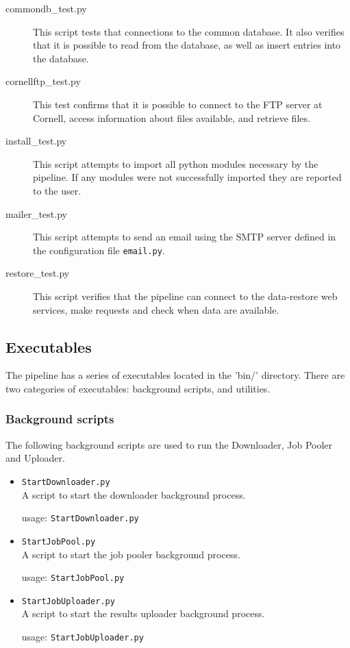 \begin{description}
    \item[commondb\_test.py] This script tests that connections to the common database. It also verifies that it is possible to read from the database, as well as insert entries into the database.

    \item[cornellftp\_test.py] This test confirms that it is possible to connect to the FTP server at Cornell, access information about files available, and retrieve files.

    \item[install\_test.py] This script attempts to import all python modules necessary by the pipeline. If any modules were not successfully imported they are reported to the user.

    \item[mailer\_test.py] This script attempts to send an email using the SMTP server defined in the configuration file \texttt{email.py}.

    \item[restore\_test.py] This script verifies that the pipeline can connect to the data-restore web services, make requests and check when data are available.
\end{description}

\subsection{Executables}
The pipeline has a series of executables located in the 'bin/' directory. There are two categories of executables: background scripts, and utilities.

\subsubsection{Background scripts}
The following background scripts are used to run the Downloader, Job Pooler and Uploader.
\begin{itemize}
    \item \texttt{StartDownloader.py} \hfill \\
        A script to start the downloader background process.

        usage: \texttt{StartDownloader.py}

    \item \texttt{StartJobPool.py} \hfill \\
        A script to start the job pooler background process.

        usage: \texttt{StartJobPool.py}

    \item \texttt{StartJobUploader.py} \hfill \\
        A script to start the results uploader background process.

        usage: \texttt{StartJobUploader.py}
\end{itemize}

